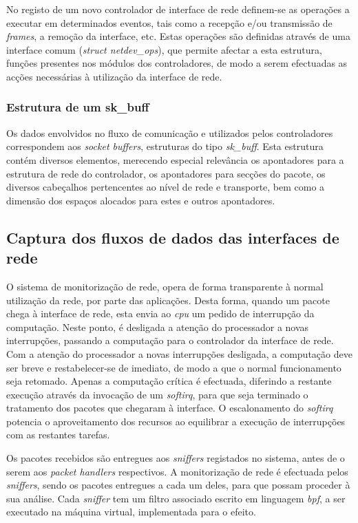 No registo de um novo controlador de interface de rede definem-se as operações a executar em determinados eventos, tais como a recepção e/ou transmissão de \textit{frames}, a remoção da interface, etc.
Estas operações são definidas através de uma interface comum (\textit{struct netdev\_ops}), que permite afectar a esta estrutura, funções presentes nos módulos dos controladores, de modo a serem efectuadas as acções necessárias à utilização da interface de rede.

\subsubsection{Estrutura de um sk\_buff}
\label{subsub:sk_buff}
Os dados envolvidos no fluxo de comunicação e utilizados pelos controladores correspondem aos \textit{socket buffers}, estruturas do tipo \textit{sk\_buff}.
Esta estrutura contém diversos elementos, merecendo especial relevância os apontadores para a estrutura de rede do controlador, os apontadores para secções do pacote, os diversos cabeçalhos pertencentes ao nível de rede e transporte, bem como a dimensão dos espaços alocados para estes e outros apontadores.

\subsection{Captura dos fluxos de dados das interfaces de rede}
\label{sub:network_cap}
O sistema de monitorização de rede, opera de forma transparente à normal utilização da rede, por parte das aplicações.
Desta forma, quando um pacote chega à interface de rede, esta envia ao \textit{cpu} um pedido de interrupção da computação.
Neste ponto, é desligada a atenção do processador a novas interrupções, passando a computação para o controlador da interface de rede.
Com a atenção do processador a novas interrupções desligada, a computação deve ser breve e restabelecer-se de imediato, de modo a que o normal funcionamento seja retomado.
Apenas a computação crítica é efectuada, diferindo a restante execução através da invocação de um \textit{softirq}, para que seja terminado o tratamento dos pacotes que chegaram à interface.
O escalonamento do \textit{softirq} potencia o aproveitamento dos recursos ao equilibrar a execução de interrupções com as restantes tarefas.

Os pacotes recebidos são entregues aos \textit{sniffers} registados no sistema, antes de o serem aos \textit{packet handlers} respectivos.
A monitorização de rede é efectuada pelos \textit{sniffers}, sendo os pacotes entregues a cada um deles, para que possam proceder à sua análise.
Cada \textit{sniffer} tem um filtro associado escrito em linguagem \textit{bpf}, a ser executado na máquina virtual, implementada para o efeito.

